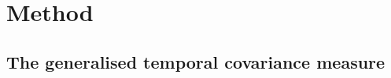 \documentclass[12pt]{article}
\numberwithin{equation}{section}
\begin{document}



\section{Method}


\subsection{The generalised temporal covariance measure}
\label{sec:gtcm}
\end{document}
